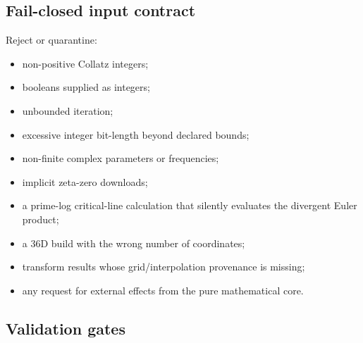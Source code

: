 \subsection{Fail-closed input contract}

Reject or quarantine:
\begin{itemize}[leftmargin=2em]
\item non-positive Collatz integers;
\item booleans supplied as integers;
\item unbounded iteration;
\item excessive integer bit-length beyond declared bounds;
\item non-finite complex parameters or frequencies;
\item implicit zeta-zero downloads;
\item a prime-log critical-line calculation that silently evaluates the divergent Euler product;
\item a 36D build with the wrong number of coordinates;
\item transform results whose grid/interpolation provenance is missing;
\item any request for external effects from the pure mathematical core.
\end{itemize}

\subsection{Validation gates}

